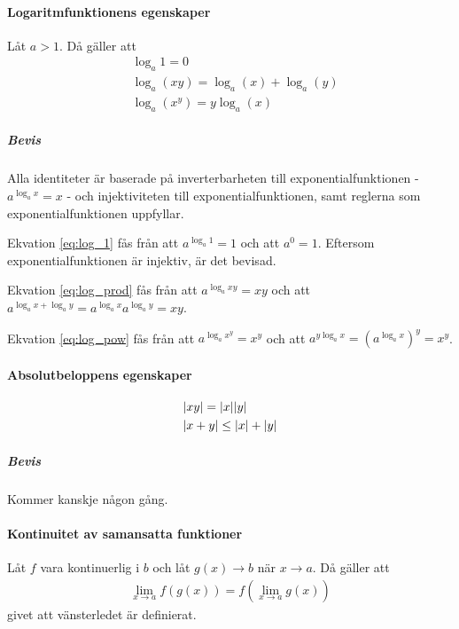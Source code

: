 \paragraph{Logaritmfunktionens egenskaper}

Låt $a > 1$. Då gäller att
\begin{align}
	&\log_a 1 = 0 \label{eq:log_1}\\
	&\log_a\left(xy\right) = \log_a\left(x\right) + \log_a\left(y\right) \label{eq:log_prod}\\
	&\log_a\left(x^y\right) = y\log_a\left(x\right) \label{eq:log_pow}
\end{align}

\subparagraph{Bevis}

Alla identiteter är baserade på inverterbarheten till exponentialfunktionen - $a^{\log_a x} = x$ - och injektiviteten till exponentialfunktionen, samt reglerna som exponentialfunktionen uppfyllar.

Ekvation \ref{eq:log_1} fås från att $a^{\log_a 1} = 1$ och att $a^0 = 1$. Eftersom exponentialfunktionen är injektiv, är det bevisad.

Ekvation \ref{eq:log_prod} fås från att $a^{\log_a xy} = xy$ och att $a^{\log_a x + \log_a y} = a^{\log_a x}a^{\log_a y}=xy$.

Ekvation \ref{eq:log_pow} fås från att $a^{\log_a x^y} = x^y$ och att $a^{y\log_a x} = \left(a^{\log_a x}\right)^y = x^y$.

\paragraph{Absolutbeloppens egenskaper}

\begin{align}
	&\abs{xy} = \abs{x}\abs{y} \label{eq:abs_prod} \\
	&\abs{x + y} \leq \abs{x} + \abs{y} \label{eq:abs_sum}
\end{align}

\subparagraph{Bevis}

Kommer kanskje någon gång.

\paragraph{Kontinuitet av samansatta funktioner}
Låt $f$ vara kontinuerlig i $b$ och låt $g(x)\to b$ när $x\to a$. Då gäller att
\begin{align*}
	\lim\limits_{x\to a}f(g(x)) = f(\lim\limits_{x\to a}g(x))
\end{align*}
givet att vänsterledet är definierat.

